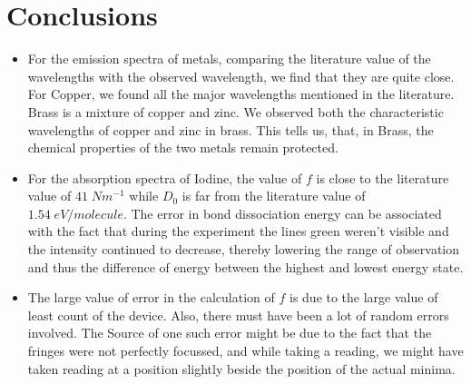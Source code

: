 \section{Conclusions}
\begin{itemize}
\item For the emission spectra of metals, comparing the literature value of the wavelengths with the observed wavelength, we find that they are quite close. For Copper, we found all the major wavelengths mentioned in the literature. Brass is a mixture of copper and zinc. We observed both the characteristic wavelengths of copper and zinc in brass. This tells us, that, in Brass, the chemical properties of the two metals remain protected.

\item For the absorption spectra of Iodine, the value of $f$ is close to the literature value of $41\; N m^{-1}$ while $D_0$ is far from the literature value of $1.54\;eV/molecule$. The error in bond dissociation energy can be associated with the fact that during the experiment the lines green weren't visible and the intensity continued to decrease, thereby lowering the range of observation and thus the difference of energy between the highest and lowest energy state.

\item The large value of error in the calculation of $f$ is due to the large value of least count of the device. Also, there must have been a lot of random errors involved. The Source of one such error might be due to the fact that the fringes were not perfectly focussed, and while taking a reading, we might have taken reading at a position slightly beside the position of the actual minima.
\end{itemize}